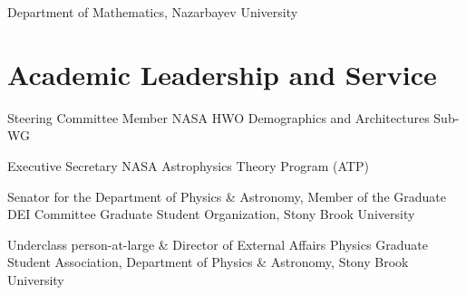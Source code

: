 \documentclass[10pt]{article} %
\begin{document}
\begin{paracol}{1}
{	Department of Mathematics, Nazarbayev University}

	

\section{Academic Leadership and Service}





	
	{Steering Committee Member}
	{NASA HWO Demographics and Architectures Sub-WG}

	{Executive Secretary}
	{NASA Astrophysics Theory Program (ATP)}

	{Senator for the Department of Physics \& Astronomy, Member of the Graduate DEI Committee}
	{Graduate Student Organization, Stony Brook University}
	
	{Underclass person-at-large \& Director of External Affairs}
	{Physics Graduate Student Association, Department of Physics \& Astronomy, Stony Brook University}
	

\end{paracol}
\end{document}
